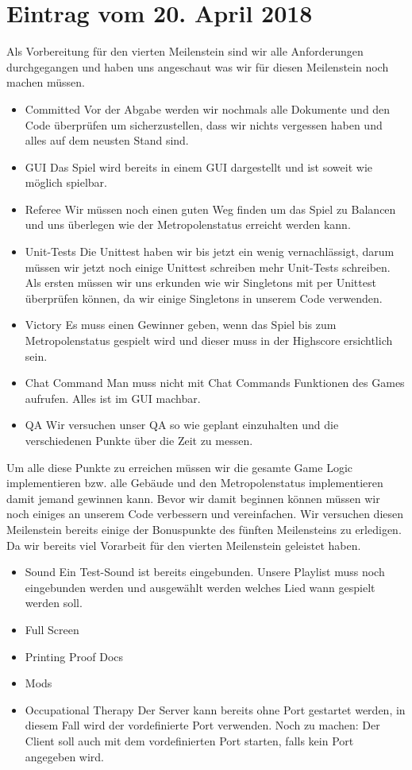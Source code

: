 \documentclass{scrartcl}
\newcommand{\n}{\newline}
\begin{document}
\section*{Eintrag vom 20. April 2018}
Als Vorbereitung für den vierten Meilenstein sind wir alle Anforderungen durchgegangen und haben uns angeschaut was wir für diesen Meilenstein noch machen müssen. 
\begin{itemize}
	\item Committed \n
	Vor der Abgabe werden wir nochmals alle Dokumente und den Code überprüfen um sicherzustellen, dass wir nichts vergessen haben und alles auf dem neusten Stand sind.
	\item GUI \n
	Das Spiel wird bereits in einem GUI dargestellt und ist soweit wie möglich spielbar. 
	\item Referee \n
	Wir müssen noch einen guten Weg finden um das Spiel zu Balancen und uns überlegen wie der Metropolenstatus erreicht werden kann.
	\item Unit-Tests \n
	Die Unittest haben wir bis jetzt ein wenig vernachlässigt, darum müssen wir jetzt noch einige Unittest schreiben mehr Unit-Tests schreiben. Als ersten müssen wir uns erkunden wie wir Singletons mit per Unittest überprüfen können, da wir einige Singletons in unserem Code verwenden. 
	\item Victory \n
	Es muss einen Gewinner geben, wenn das Spiel bis zum Metropolenstatus gespielt wird und dieser muss in der Highscore ersichtlich sein.
	\item Chat Command \n
	Man muss nicht mit Chat Commands Funktionen des Games aufrufen. Alles ist im GUI machbar.
	\item QA \n
	Wir versuchen unser QA so wie geplant einzuhalten und die verschiedenen Punkte über die Zeit zu messen.
\end{itemize}
Um alle diese Punkte zu erreichen müssen wir die gesamte Game Logic implementieren bzw. alle Gebäude und den Metropolenstatus implementieren damit jemand gewinnen kann. Bevor wir damit beginnen können müssen wir noch einiges an unserem Code verbessern und vereinfachen.\n
Wir versuchen diesen Meilenstein bereits einige der Bonuspunkte des fünften Meilensteins zu erledigen. Da wir bereits viel Vorarbeit für den vierten Meilenstein geleistet haben. 

\begin{itemize}
	\item Sound \n
	Ein Test-Sound ist bereits eingebunden. Unsere Playlist muss noch eingebunden werden und ausgewählt werden welches Lied wann gespielt werden soll. 
	\item Full Screen
	\item Printing Proof Docs
	\item Mods
	\item Occupational Therapy \n
	Der Server kann bereits ohne Port gestartet werden, in diesem Fall wird der vordefinierte Port verwenden. Noch zu machen: Der Client soll auch mit dem vordefinierten Port starten, falls kein Port angegeben wird.
\end{itemize}
\end{document}
